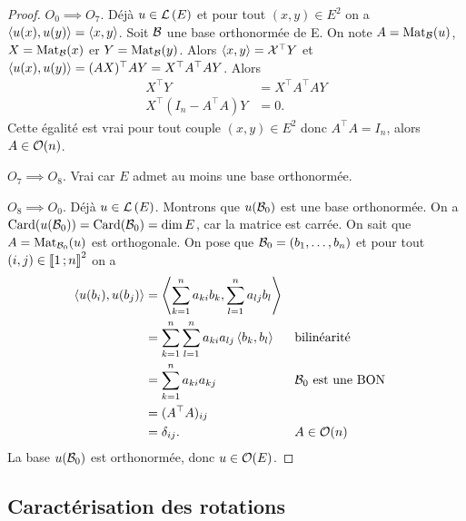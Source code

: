 \begin{proof}
  $O_0 \implies O_7$. Déjà $u \in \mathcal{L}\left(E\right)$ et pour tout $(x,y)\in E^2$ on a $\left\langle{u(x)},{u(y)}\right\rangle=\left\langle{x},{y}\right\rangle$. Soit $\mathcal{B}$ une base orthonormée de E. On note $A=\mathrm{Mat}_{\mathcal{B}}(u)$, $X=\mathrm{Mat}_{\mathcal{B}}(x)$ er $Y=\mathrm{Mat}_{\mathcal{B}}(y)$. Alors $\left\langle{x},{y}\right\rangle=\mathcal{X}^\top Y$ et $\left\langle{u(x)},{u(y)}\right\rangle = (AX)^\top AY = X^\top A^\top A Y$. Alors
  \begin{align}
    X^\top Y &= X^\top A^\top A Y\\
    X^\top(I_n - A^\top A)Y &=0.
  \end{align}
  Cette égalité est vrai pour tout couple $(x,y) \in E^2$ donc $A^\top A= I_n$, alors $A \in \mathcal{O}\!\left(n\right)$.

  $O_7 \implies O_8$. Vrai car $E$ admet au moins une base orthonormée.

  $O_8 \implies O_0$. Déjà $u \in \mathcal{L}\left(E\right)$. Montrons que $u(\mathcal{B}_0)$ est une base orthonormée. On a $\operatorname{Card}(u(\mathcal{B}_0))=\operatorname{Card}(\mathcal{B}_0)=\operatorname{dim} E$, car la matrice est carrée. On sait que $A=\mathrm{Mat}_{\mathcal{B}_0}(u)$ est orthogonale. On pose que $\mathcal{B}_0 = (b_1, \ldots, b_n)$ et pour tout $(i,j) \in \mathopen{\llbracket}1\mathclose{}\mathpunct{};n\mathclose{\rrbracket}^2$ on a
  \begin{align}
    \left\langle{u(b_i)},{u(b_j)}\right\rangle &=\left\langle{\sum_{k=1}^n a_{ki}b_k},{\sum_{l=1}^n a_{lj}b_l}\right\rangle \\
    &=\sum_{k=1}^n \sum_{l=1}^n a_{ki} a_{lj} \left\langle{b_k},{b_l}\right\rangle && \text{bilinéarité} \\
    &=\sum_{k=1}^n a_{ki}a_{kj} && \mathcal{B}_0 \text{~est une BON} \\
    &=(A^\top A)_{ij} \\
    &=\delta_{ij}. && A \in \mathcal{O}\!\left(n\right)
  \end{align}
  La base $u(\mathcal{B}_0)$ est orthonormée, donc $u \in \mathcal{O}\!\left(E\right)$.
\end{proof}

\subsection{Caractérisation des rotations}

